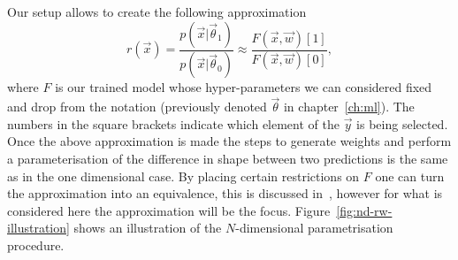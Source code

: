 Our setup allows to create the following approximation
\begin{equation}
  r(\vec{x}) =  \frac{p(\vec{x}|\vec{\theta}_{1})}{p(\vec{x}|\vec{\theta}_{0})}
  \approx \frac{F(\vec{x}, \vec{w})[1]}{F(\vec{x}, \vec{w})[0]},
  \label{eq:bdtr-approximation}
\end{equation}
where $F$ is our trained model whose hyper-parameters we can considered fixed
and drop from the notation (previously denoted $\vec{\theta}$ in
chapter~\ref{ch:ml}). The numbers in the square brackets indicate which element
of the $\vec{y}$ is being selected. Once the above approximation is made the
steps to generate weights and perform a parameterisation of the difference in
shape between two predictions is the same as in the one dimensional case. By
placing certain restrictions on $F$ one can turn the approximation into an
equivalence, this is discussed in~\cite{modelling-note}, however for what is
considered here the approximation will be the focus.
Figure~\ref{fig:nd-rw-illustration} shows an illustration of the $N$-dimensional
parametrisation procedure.



